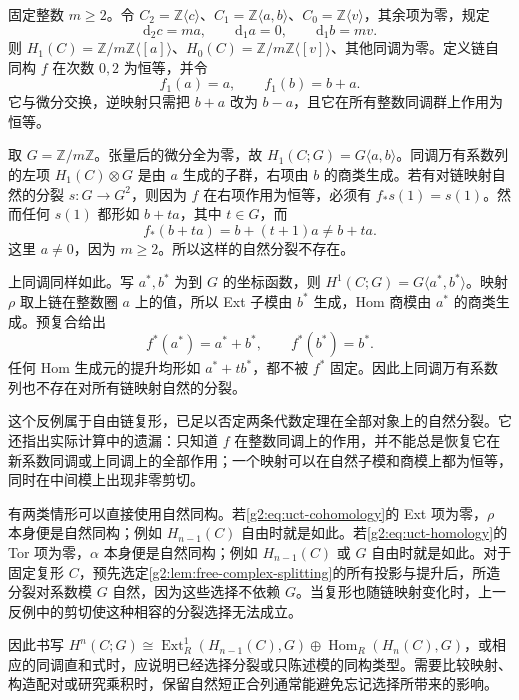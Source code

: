 \begin{example}\label{g2:exm:uct-nonnatural-splitting}
	固定整数 \(m\ge2\)。令 \(C_2=\mathbb Z\langle c\rangle\)、\(C_1=\mathbb Z\langle a,b\rangle\)、\(C_0=\mathbb Z\langle v\rangle\)，其余项为零，规定
	\[
		\mathrm{d}_2c=ma,\qquad\mathrm{d}_1a=0,\qquad\mathrm{d}_1b=mv.
	\]
	则 \(H_1(C)=\mathbb Z/m\mathbb Z\langle[a]\rangle\)、\(H_0(C)=\mathbb Z/m\mathbb Z\langle[v]\rangle\)、其他同调为零。定义链自同构 \(f\) 在次数 \(0,2\) 为恒等，并令
	\[
		f_1(a)=a,\qquad f_1(b)=b+a.
	\]
	它与微分交换，逆映射只需把 \(b+a\) 改为 \(b-a\)，且它在所有整数同调群上作用为恒等。

	取 \(G=\mathbb Z/m\mathbb Z\)。张量后的微分全为零，故 \(H_1(C;G)=G\langle a,b\rangle\)。同调万有系数列的左项 \(H_1(C)\otimes G\) 是由 \(a\) 生成的子群，右项由 \(b\) 的商类生成。若有对链映射自然的分裂 \(s:G\to G^2\)，则因为 \(f\) 在右项作用为恒等，必须有 \(f_*s(1)=s(1)\)。然而任何 \(s(1)\) 都形如 \(b+ta\)，其中 \(t\in G\)，而
	\[
		f_*(b+ta)=b+(t+1)a\ne b+ta.
	\]
	这里 \(a\ne0\)，因为 \(m\ge2\)。所以这样的自然分裂不存在。

	上同调同样如此。写 \(a^*,b^*\) 为到 \(G\) 的坐标函数，则 \(H^1(C;G)=G\langle a^*,b^*\rangle\)。映射 \(\rho\) 取上链在整数圈 \(a\) 上的值，所以 Ext 子模由 \(b^*\) 生成，Hom 商模由 \(a^*\) 的商类生成。预复合给出
	\[
		f^*(a^*)=a^*+b^*,\qquad f^*(b^*)=b^*.
	\]
	任何 Hom 生成元的提升均形如 \(a^*+tb^*\)，都不被 \(f^*\) 固定。因此上同调万有系数列也不存在对所有链映射自然的分裂。
\end{example}

这个反例属于自由链复形，已足以否定两条代数定理在全部对象上的自然分裂。它还指出实际计算中的遗漏：只知道 \(f\) 在整数同调上的作用，并不能总是恢复它在新系数同调或上同调上的全部作用；一个映射可以在自然子模和商模上都为恒等，同时在中间模上出现非零剪切。

\ProseParagraphBreak

有两类情形可以直接使用自然同构。若\eqref{g2:eq:uct-cohomology}的 Ext 项为零，\(\rho\) 本身便是自然同构；例如 \(H_{n-1}(C)\) 自由时就是如此。若\eqref{g2:eq:uct-homology}的 Tor 项为零，\(\alpha\) 本身便是自然同构；例如 \(H_{n-1}(C)\) 或 \(G\) 自由时就是如此。对于固定复形 \(C\)，预先选定\cref{g2:lem:free-complex-splitting}的所有投影与提升后，所造分裂对系数模 \(G\) 自然，因为这些选择不依赖 \(G\)。当复形也随链映射变化时，上一反例中的剪切使这种相容的分裂选择无法成立。

\ProseParagraphBreak

因此书写 \(H^n(C;G)\cong\operatorname{Ext}_R^1(H_{n-1}(C),G)\oplus\operatorname{Hom}_R(H_n(C),G)\)，或相应的同调直和式时，应说明已经选择分裂或只陈述模的同构类型。需要比较映射、构造配对或研究乘积时，保留自然短正合列通常能避免忘记选择所带来的影响。
